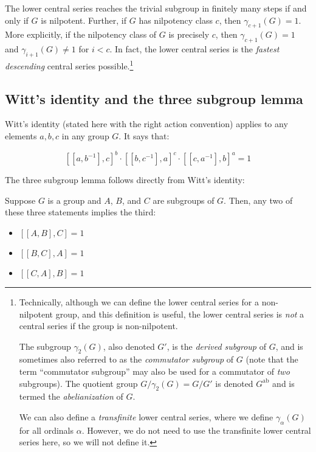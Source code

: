 The lower central series reaches the trivial subgroup in finitely many
steps if and only if $G$ is nilpotent. Further, if $G$ has nilpotency
class $c$, then $\gamma_{c+1}(G) = 1$. More explicitly, if the
nilpotency class of $G$ is precisely $c$, then $\gamma_{c+1}(G) = 1$
and $\gamma_{i+1}(G) \ne 1$ for $i < c$. In fact, the lower central
series is the {\em fastest descending} central series
possible.\footnote{Technically, although we can define the lower
  central series for a non-nilpotent group, and this definition is
  useful, the lower central series is {\em not} a central series if
  the group is non-nilpotent.

The subgroup $\gamma_2(G)$, also denoted $G'$, is the {\em derived
  subgroup} of $G$, and is sometimes also referred to as the {\em
  commutator subgroup} of $G$ (note that the term ``commutator
subgroup'' may also be used for a commutator of {\em two}
subgroups). The quotient group $G/\gamma_2(G) = G/G'$ is denoted
$G^{\operatorname{ab}}$ and is termed the {\em abelianization} of $G$.

We can also define a {\em transfinite} lower central series, where we
define $\gamma_\alpha(G)$ for all ordinals $\alpha$. However, we do
not need to use the transfinite lower central series here, so we will
not define it.}

\subsection{Witt's identity and the three subgroup lemma}\label{appsec:witt-three-subgroup}

Witt's identity (stated here with the right action convention) applies
to any elements $a,b,c$ in any group $G$. It says that:

$$[[a,b^{-1}],c]^b \cdot [[b,c^{-1}],a]^c \cdot [[c,a^{-1}],b]^a  = 1$$

The three subgroup lemma follows directly from Witt's identity:

\begin{lemma}
  Suppose $G$ is a group and $A$, $B$, and $C$ are subgroups of
  $G$. Then, any two of these three statements implies the third:

  \begin{itemize}
  \item $[[A,B],C] = 1$
  \item $[[B,C],A] = 1$
  \item $[[C,A],B] = 1$
  \end{itemize}
\end{lemma}

